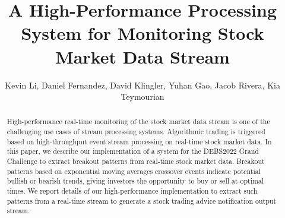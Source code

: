 \documentclass[sigconf]{acmart}
\begin{document}

\title{A High-Performance Processing System for Monitoring Stock Market Data Stream}


\author{Kevin Li, Daniel Fernandez, David Klingler, Yuhan Gao, Jacob Rivera, Kia Teymourian}



\begin{abstract}
  High-performance real-time monitoring of the stock market data stream is one of the challenging use cases of
  stream processing systems. Algorithmic trading is triggered based on high-throughput event stream processing on real-time stock market data.
  In this paper, we describe our implementation of a system for the DEBS2022 Grand Challenge to extract
  breakout patterns from real-time stock market data. Breakout patterns based on exponential moving averages
  crossover events indicate potential bullish or bearish trends, giving investors the opportunity to buy or sell
  at optimal times. We report details of our high-performance implementation to extract such patterns from a real-time stream to generate a stock
  trading advice notification output stream.
\end{abstract}

\end{document}

